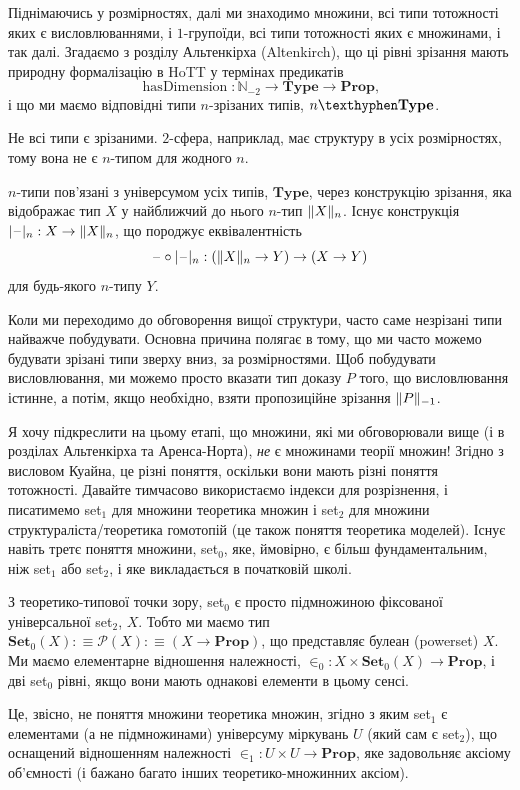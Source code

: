 \documentclass[12pt]{article}
\newcommand*{\Ntwo}{\mathbb{N}_{-2}}
\newcommand*{\Type}{\ensuremath{\mathbf{Type}}}
\newcommand*{\Prop}{\ensuremath{\mathbf{Prop}}}
\newcommand*{\Set}{\ensuremath{\mathbf{Set}}}
\newcommand*{\blank}{\mathord{\hspace{1pt}\text{--}\hspace{1pt}}}
\newcommand*{\trType}[1]{\ensuremath{#1\mathbf{\texthyphen Type}}}
\DeclareMathOperator{\hasDimen}{hasDimension}
\DeclarePairedDelimiter\trunc{\lVert}{\rVert} %
\DeclarePairedDelimiter\tr{\lvert}{\rvert} %
\begin{document}
Піднімаючись у розмірностях, далі ми знаходимо множини, всі типи тотожності яких є висловлюваннями, і $1$-групоїди, всі типи тотожності яких є множинами, і так далі. Згадаємо з розділу Альтенкірха (Altenkirch), що ці рівні зрізання мають природну формалізацію в HoTT у термінах предикатів
\[
  \hasDimen : \Ntwo \to \Type \to \Prop,
\]
і що ми маємо відповідні типи $n$-зрізаних типів, \trType n.

Не всі типи є зрізаними. $2$-сфера, наприклад, має структуру в усіх розмірностях, тому вона не є $n$-типом для жодного $n$.

$n$-типи пов'язані з універсумом усіх типів, $\Type$, через конструкцію зрізання, яка відображає тип $X$ у найближчий до нього $n$-тип $\trunc X_n$. Існує конструкція $\tr{\blank}_n : X \to
\trunc X_n$, що породжує еквівалентність
\[
  \blank \circ \tr{\blank}_n : (\trunc X_n \to Y) \to (X \to Y)
\]
для будь-якого $n$-типу $Y$.

Коли ми переходимо до обговорення вищої структури, часто саме незрізані типи найважче побудувати. Основна причина полягає в тому, що ми часто можемо будувати зрізані типи зверху вниз, за розмірностями. Щоб побудувати висловлювання, ми можемо просто вказати тип доказу $P$ того, що висловлювання істинне, а потім, якщо необхідно, взяти пропозиційне зрізання $\trunc{P}_{-1}$.

Я хочу підкреслити на цьому етапі, що множини, які ми обговорювали вище (і в розділах Альтенкірха та Аренса-Норта), \emph{не} є множинами теорії множин! Згідно з висловом Куайна, це різні поняття, оскільки вони мають різні поняття тотожності. Давайте тимчасово використаємо індекси для розрізнення, і писатимемо set$_1$ для множини теоретика множин і set$_2$ для множини структураліста/теоретика гомотопій (це також поняття теоретика моделей). Існує навіть третє поняття множини, set$_0$, яке, ймовірно, є більш фундаментальним, ніж set$_1$ або set$_2$, і яке викладається в початковій школі.

З теоретико-типової точки зору, set$_0$ є просто підмножиною фіксованої універсальної set$_2$, $X$. Тобто ми маємо тип
$\Set_0(X) :\equiv \mathcal P(X) :\equiv (X \to \Prop)$,
що представляє булеан (powerset) $X$. Ми маємо елементарне відношення належності, ${\in}_0: X \times \Set_0(X) \to \Prop$,
і дві set$_0$ рівні, якщо вони мають однакові елементи в цьому сенсі.

Це, звісно, не поняття множини теоретика множин, згідно з яким set$_1$ є елементами (а не підмножинами) універсуму міркувань $U$ (який сам є set$_2$), що оснащений відношенням належності ${\in}_1 : U \times U \to \Prop$, яке задовольняє аксіому об'ємності (і бажано багато інших теоретико-множинних аксіом).
\end{document}
